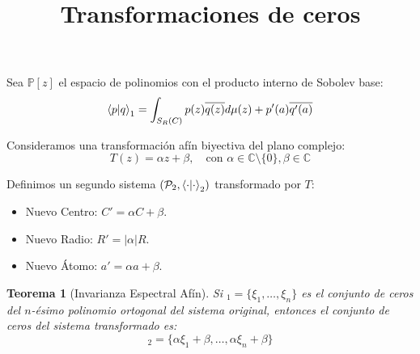 \documentclass[12pt,a4paper]{article}
\title{Transformaciones de ceros}
\date{}
\author{}
\newtheorem{teorema}{Teorema}
\newcommand{\C}{\mathbb{C}}
\newcommand{\Poly}{\mathbb{P}[z]}
\begin{document}
\maketitle

Sea $\Poly$ el espacio de polinomios con el producto interno de Sobolev base:
\begin{equation}
    \ip{p}{q}_1 = \int_{S_R(C)} p(z)\overline{q(z)} d\mu(z) +  p'(a)\overline{q'(a)}
\end{equation}

Consideramos una transformación afín biyectiva del plano complejo:
$$ T(z) = \alpha z + \beta, \quad \text{con } \alpha \in \C \setminus \{0\}, \beta \in \C $$

Definimos un segundo sistema $(\mathcal{P}_2, \ip{\cdot}{\cdot}_2)$ transformado por $T$:

\begin{itemize}
    \item Nuevo Centro: $C' = \alpha C + \beta$.
    \item Nuevo Radio: $R' = |\alpha| R$.
    \item Nuevo Átomo: $a' = \alpha a + \beta$.
\end{itemize}

\begin{teorema}[Invarianza Espectral Afín]
Si $_1 = \{\xi_1, \dots, \xi_n\}$ es el conjunto de ceros del $n$-ésimo polinomio ortogonal del sistema original, entonces el conjunto de ceros del sistema transformado es:
$$ _2 = \{ \alpha \xi_1 + \beta, \dots, \alpha \xi_n + \beta \} $$
\end{teorema}
\end{document}
